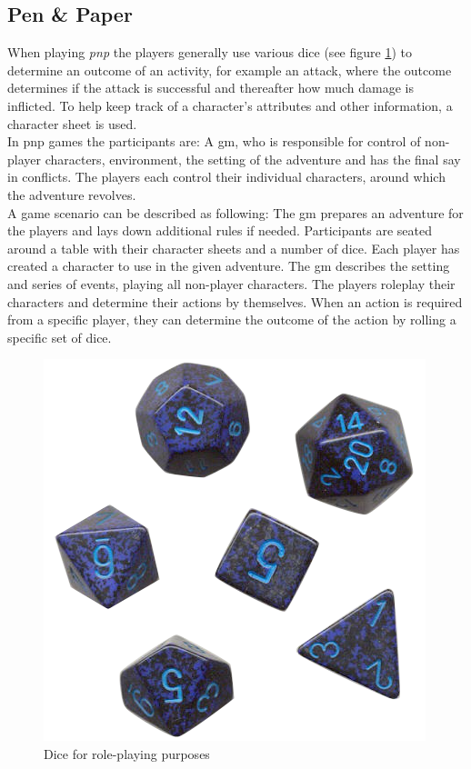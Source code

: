 \subsection{Pen \& Paper}
When playing \emph{\ac{pnp}} the players generally use various dice (see figure \ref{dice}) to determine an outcome of an activity, for example an attack, where the outcome determines if the attack is successful and thereafter how much damage is inflicted. To help keep track of a character's attributes and other information, a character sheet is used.\\
In \ac{pnp} games the participants are: A \ac{gm}, who is responsible for control of non-player characters, environment, the setting of the adventure and has the final say in conflicts. The players each control their individual characters, around which the adventure revolves.\\
A game scenario can be described as following: The \ac{gm} prepares an adventure for the players and lays down additional rules if needed. Participants are seated around a table with their character sheets and a number of dice. Each player has created a character to use in the given adventure. The \ac{gm} describes the setting and series of events, playing all non-player characters. The players roleplay their characters and determine their actions by themselves. When an action is required from a specific player, they can determine the outcome of the action by rolling a specific set of dice.
\begin{figure}[!h]
\centering
\includegraphics[scale=0.35]{img/rpgdice.png}
\caption{Dice for role-playing purposes}
\label{dice}
\end{figure}

